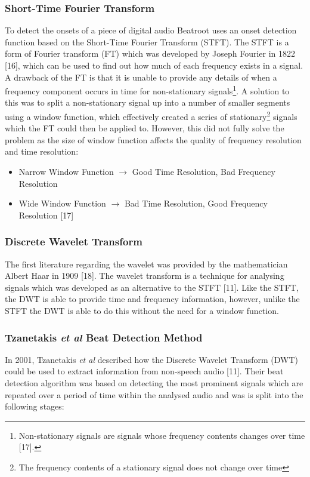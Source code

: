 \documentclass[a4paper, 11pt]{article}
\begin{document}
\subsubsection{Short-Time Fourier Transform}
To detect the onsets of a piece of digital audio Beatroot uses an onset detection function based on the Short-Time Fourier Transform (STFT). The STFT is a form of Fourier transform (FT) which was developed by Joseph Fourier in 1822 [16], which can be used to find out how much of each frequency exists in a signal. A drawback of the FT is that it is unable to provide any details of when a frequency component occurs in time for non-stationary signals\footnote{Non-stationary signals are signals whose frequency contents changes over time [17].}. A solution to this was to split a non-stationary signal up into a number of smaller segments using a window function, which effectively created a series of stationary\footnote{The frequency contents of a stationary signal does not change over time} signals which the FT could then be applied to. However, this did not fully solve the problem as the size of window function affects the quality of frequency resolution and time resolution:
\begin{itemize}
\item Narrow Window Function $\longrightarrow$  Good Time Resolution, Bad Frequency Resolution
\item Wide Window Function $\longrightarrow$  Bad Time Resolution, Good Frequency Resolution [17]
\end{itemize}

\subsubsection{Discrete Wavelet Transform}
The first literature regarding the wavelet was provided by the mathematician Albert Haar in 1909 [18]. The wavelet transform is a technique for analysing signals which was developed as an alternative to the STFT [11]. Like the STFT, the DWT is able to provide time and frequency information, however, unlike the STFT the DWT is able to do this without the need for a window function. 

\subsubsection{Tzanetakis \textit{et al} Beat Detection Method}
In 2001, Tzanetakis \textit{et al} described how the Discrete Wavelet Transform (DWT) could be used to extract information from non-speech audio [11]. Their beat detection algorithm was based on detecting the most prominent signals which are repeated over a period of time within the analysed audio and was is split into the following stages: 
\end{document}
